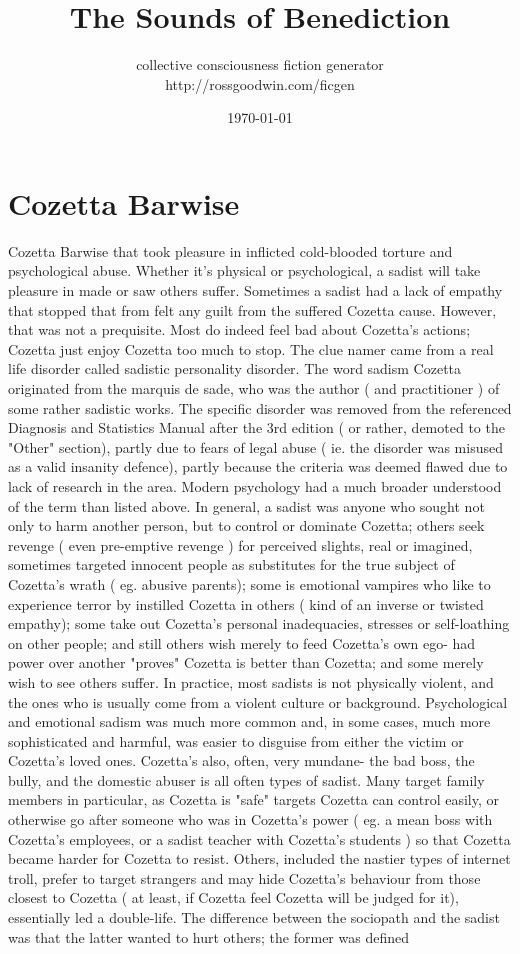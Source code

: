 \documentclass[12pt]{book}
\title{The Sounds of Benediction}
\author{collective consciousness fiction generator\\http://rossgoodwin.com/ficgen}
\date{\today}
\begin{document}
\maketitle



\chapter{Cozetta Barwise}

Cozetta Barwise that took pleasure in inflicted cold-blooded torture and psychological abuse. Whether it's physical or psychological, a sadist will take pleasure in made or saw others suffer. Sometimes a sadist had a lack of empathy that stopped that from felt any guilt from the suffered Cozetta cause. However, that was not a prequisite. Most do indeed feel bad about Cozetta's actions; Cozetta just enjoy Cozetta too much to stop. The clue namer came from a real life disorder called sadistic personality disorder. The word sadism Cozetta originated from the marquis de sade, who was the author ( and practitioner ) of some rather sadistic works. The specific disorder was removed from the referenced Diagnosis and Statistics Manual after the 3rd edition ( or rather, demoted to the "Other" section), partly due to fears of legal abuse ( ie. the disorder was misused as a valid insanity defence), partly because the criteria was deemed flawed due to lack of research in the area. Modern psychology had a much broader understood of the term than listed above. In general, a sadist was anyone who sought not only to harm another person, but to control or dominate Cozetta; others seek revenge ( even pre-emptive revenge ) for perceived slights, real or imagined, sometimes targeted innocent people as substitutes for the true subject of Cozetta's wrath ( eg. abusive parents); some is emotional vampires who like to experience terror by instilled Cozetta in others ( kind of an inverse or twisted empathy); some take out Cozetta's personal inadequacies, stresses or self-loathing on other people; and still others wish merely to feed Cozetta's own ego- had power over another "proves" Cozetta is better than Cozetta; and some merely wish to see others suffer. In practice, most sadists is not physically violent, and the ones who is usually come from a violent culture or background. Psychological and emotional sadism was much more common and, in some cases, much more sophisticated and harmful, was easier to disguise from either the victim or Cozetta's loved ones. Cozetta's also, often, very mundane- the bad boss, the bully, and the domestic abuser is all often types of sadist. Many target family members in particular, as Cozetta is "safe" targets Cozetta can control easily, or otherwise go after someone who was in Cozetta's power ( eg. a mean boss with Cozetta's employees, or a sadist teacher with Cozetta's students ) so that Cozetta became harder for Cozetta to resist. Others, included the nastier types of internet troll, prefer to target strangers and may hide Cozetta's behaviour from those closest to Cozetta ( at least, if Cozetta feel Cozetta will be judged for it), essentially led a double-life. The difference between the sociopath and the sadist was that the latter wanted to hurt others; the former was defined 
\end{document}
